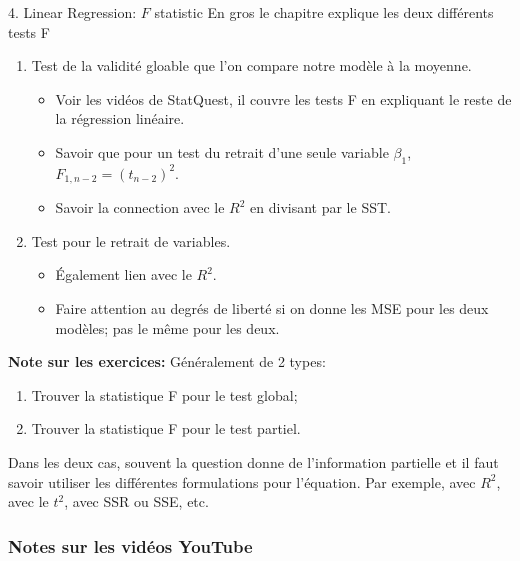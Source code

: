 \documentclass[12pt, titlepage, french]{report}
\begin{document}
\begin{CHPT_SUMM}{4. Linear Regression: $F$ statistic}
En gros le chapitre explique les deux différents tests F
\begin{enumerate}
	\item	Test de la validité gloable que l'on compare notre modèle à la moyenne.
	\begin{itemize}
		\item	Voir les vidéos de StatQuest, il couvre les tests F en expliquant le reste de la régression linéaire.
		\item	Savoir que pour un test du retrait d'une seule variable $\beta_{1}$, $F_{1, n - 2} = (t_{n - 2})^{2}$.
		\item	Savoir la connection avec le $R^{2}$ en divisant par le SST.
	\end{itemize}
	\item	Test pour le retrait de variables.
	\begin{itemize}
		\item	Également lien avec le $R^{2}$.
		\item	Faire attention au degrés de liberté si on donne les MSE pour les deux modèles; pas le même pour les deux.
	\end{itemize}
\end{enumerate}
\textbf{Note sur les exercices:} Généralement de 2 types:
\begin{enumerate}
	\item	Trouver la statistique F pour le test global;
	\item	Trouver la statistique F pour le test partiel. 
\end{enumerate}
Dans les deux cas, souvent la question donne de l'information partielle et il faut savoir utiliser les différentes formulations pour l'équation. Par exemple, avec $R^{2}$, avec le $t^{2}$, avec SSR ou SSE, etc.
\end{CHPT_SUMM}

\subsubsection{Notes sur les vidéos YouTube}
\end{document}
